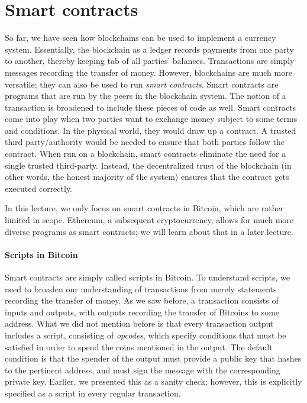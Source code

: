 \documentclass{article}
\begin{document}
\section*{Smart contracts}
So far, we have seen how blockchains can be used to implement a currency system. Essentially, the blockchain as a ledger records payments from one party to another, thereby keeping tab of all parties' balances. Transactions are simply messages recording the transfer of money. However, blockchains are much more versatile; they can also be used to run \textit{smart contracts}. Smart contracts are programs that are run by the peers in the blockchain system. The notion of a transaction is broadened to include these pieces of code as well. Smart contracts come into play when two parties want to exchange money subject to some terms and conditions. In the physical world, they would draw up a contract. A trusted third party/authority would be needed to ensure that both parties follow the contract. When run on a blockchain, smart contracts eliminate the need for a single trusted third-party. Instead, the decentralized trust of the blockchain (in other words, the honest majority of the system) ensures that the contract gets executed correctly.

In this lecture, we only focus on smart contracts in Bitcoin, which are rather limited in scope. Ethereum, a subsequent cryptocurrency, allows for much more diverse programs as smart contracts; we will learn about that in a later lecture.

\paragraph{Scripts in Bitcoin}
Smart contracts are simply called scripts in Bitcoin. To understand scripts, we need to broaden our understanding of transactions from merely statements recording the transfer of money. As we saw before, a transaction consists of inputs and outputs, with outputs recording the transfer of Bitcoins to some address. What we did not mention before is that every transaction output includes a script, consisting of \textit{opcodes}, which specify conditions that must be satisfied in order to spend the coins mentioned in the output. The default condition is that the spender of the output must provide a public key that hashes to the pertinent address, and must sign the message with the corresponding private key. Earlier, we presented this as a sanity check; however, this is explicitly specified as a script in every regular transaction.
\end{document}
